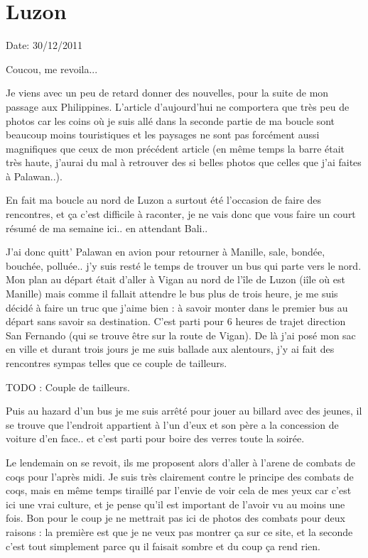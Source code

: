 \section{Luzon}

Date: 30/12/2011

\begin{multicols}{2}

Coucou, me revoila...

Je viens avec un peu de retard donner des nouvelles, pour la suite de mon passage aux Philippines. L'article d'aujourd'hui ne comportera que très peu de photos car les coins où je suis allé dans la seconde partie de ma boucle sont beaucoup moins touristiques et les paysages ne sont pas forcément aussi magnifiques que ceux de mon précédent article (en même temps la barre était très haute, j'aurai du mal à retrouver des si belles photos que celles que j'ai faites à Palawan..).

En fait ma boucle au nord de Luzon a surtout été l'occasion de faire des rencontres, et ça c'est difficile à raconter, je ne vais donc que vous faire un court résumé de ma semaine ici.. en attendant Bali..

J'ai donc quitt' Palawan en avion pour retourner à Manille, sale, bondée, bouchée, polluée.. j'y suis resté le temps de trouver un bus qui parte vers le nord. Mon plan au départ était d'aller à Vigan au nord de l'île de Luzon (iîle où est Manille) mais comme il fallait attendre le bus plus de trois heure, je me suis décidé à faire un truc que j'aime bien : à savoir monter dans le premier bus au départ sans savoir sa destination. C'est parti pour 6 heures de trajet direction San Fernando (qui se trouve être sur la route de Vigan). De là j'ai posé mon sac en ville et durant trois jours je me suis ballade aux alentours, j'y ai fait des rencontres sympas telles que ce couple de tailleurs.

TODO : Couple de tailleurs.

Puis au hazard d'un bus je me suis arrêté pour jouer au billard avec des jeunes, il se trouve que l'endroit appartient à l'un d'eux et son père a la concession de voiture d'en face.. et c'est parti pour boire des verres toute la soirée.


Le lendemain on se revoit, ils me proposent alors d'aller à l'arene de combats de coqs pour l'après midi. Je suis très clairement contre le principe des combats de coqs, mais en même temps tiraillé par l'envie de voir cela de mes yeux car c'est ici une vrai culture, et je pense qu'il est important de l'avoir vu au moins une fois. Bon pour le coup je ne mettrait pas ici de photos des combats pour deux raisons : la première est que je ne veux pas montrer ça sur ce site, et la seconde c'est tout simplement parce qu il faisait sombre et du coup ça rend rien.


\end{multicols}

